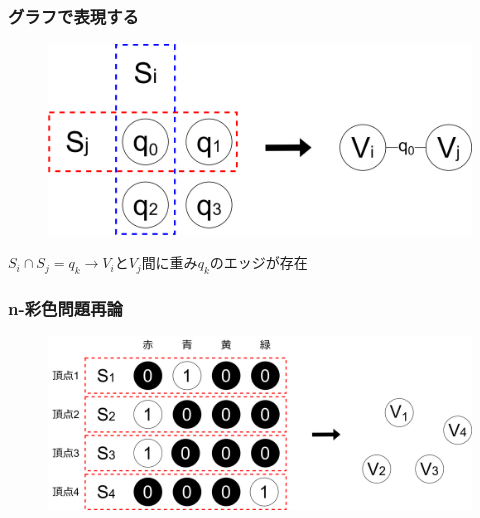 
\begin{frame}
  \frametitle{グラフで表現する}
  \begin{figure}
    \includegraphics[width=0.8\linewidth]{data/bit_to_graph.png}
  \end{figure}
  \centering
  $S_i\cap S_j = q_k \rightarrow V_i \text{と} V_j \text{間に重み}q_k\text{のエッジが存在}$
\end{frame}

\begin{frame}
  \frametitle{n-彩色問題再論}
  \begin{figure}
      \includegraphics[width=0.85\linewidth]{data/kanzen1ji_to_graph}
  \end{figure}

\end{frame}

